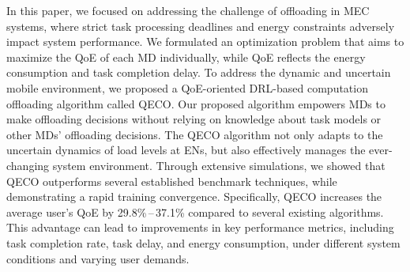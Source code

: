 \documentclass[10pt, journal,letterpaper]{IEEEtran}
\begin{document}


In this paper, we focused on addressing the challenge of offloading in MEC systems, where strict task processing deadlines and energy constraints adversely impact system performance. We formulated an optimization problem that aims to maximize the QoE of each MD individually, while QoE reflects the energy consumption and task completion delay. To address the dynamic and uncertain mobile environment, we proposed a QoE-oriented DRL-based computation offloading algorithm called QECO. Our proposed algorithm empowers MDs to make offloading decisions without relying on knowledge about task models or other MDs' offloading decisions. The QECO algorithm not only adapts to the uncertain dynamics of load levels at ENs, but also effectively manages the ever-changing system environment. Through extensive simulations, we showed that QECO outperforms several established benchmark techniques, while demonstrating a rapid training convergence. Specifically, QECO increases the average user's QoE by 29.8\%\,--\,37.1\% compared to several existing algorithms. This advantage can lead to improvements in key performance metrics, including task completion rate, task delay, and energy consumption, under different system conditions and varying user demands.
\end{document}
